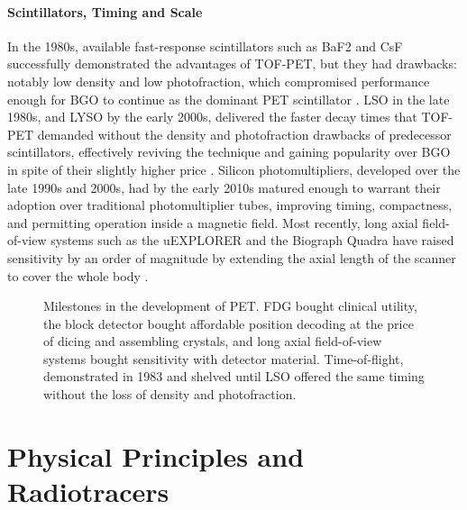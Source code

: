 \paragraph{Scintillators, Timing and Scale}
In the 1980s, available fast-response scintillators such as BaF2 and CsF successfully demonstrated the advantages of TOF-PET, but they had drawbacks: notably low density and low photofraction, which compromised performance enough for BGO to continue as the dominant PET scintillator \cite{Moses2007}.
LSO in the late 1980s, and LYSO by the early 2000s, delivered the faster decay times that TOF-PET demanded without the density and photofraction drawbacks of predecessor scintillators, effectively reviving the technique and gaining popularity over BGO in spite of their slightly higher price \cite{Moses2007}.
Silicon photomultipliers, developed over the late 1990s and 2000s, had by the early 2010s matured enough to warrant their adoption over traditional photomultiplier tubes, improving timing, compactness, and permitting operation inside a magnetic field.
Most recently, long axial field-of-view systems such as the uEXPLORER and the Biograph Quadra have raised sensitivity by an order of magnitude by extending the axial length of the scanner to cover the whole body \cite{Vandenberghe2020, slhd2021quadra}.

\begin{figure}[htbp]
	\centering
	
	\caption[Broad milestones in the development of PET]{%
		Milestones in the development of PET.
		FDG bought clinical utility, the block detector bought affordable position decoding at the price of dicing and assembling crystals, and long axial field-of-view systems bought sensitivity with detector material.
		Time-of-flight, demonstrated in 1983 and shelved until LSO offered the same timing without the loss of density and photofraction.}
	\label{fig:pet-timeline}
\end{figure}

\section{Physical Principles and Radiotracers}

